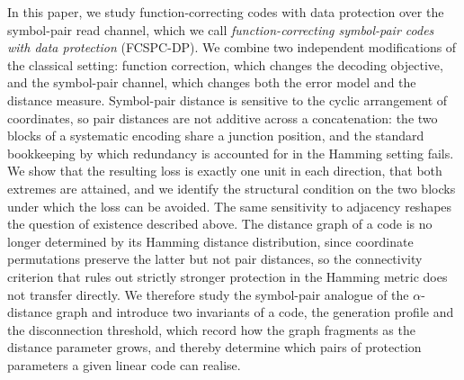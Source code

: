 \documentclass[11pt,draftclsnofoot,journal,onecolumn]{IEEEtran}
\begin{document}
        In this paper, we study function-correcting codes with data protection over the symbol-pair read channel, which we call \emph{function-correcting symbol-pair codes with data protection} (FCSPC-DP). We combine two independent modifications of the classical setting: function correction, which changes the decoding objective, and the symbol-pair channel, which changes both the error model and the distance measure. Symbol-pair distance is sensitive to the cyclic arrangement of coordinates, so pair distances are not additive across a concatenation: the two blocks of a systematic encoding share a junction position, and the standard bookkeeping by which redundancy is accounted for in the Hamming setting fails. We show that the resulting loss is exactly one unit in each direction, that both extremes are attained, and we identify the structural condition on the two blocks under which the loss can be avoided. The same sensitivity to adjacency reshapes the question of existence described above. The distance graph of a code is no longer determined by its Hamming distance distribution, since coordinate permutations preserve the latter but not pair distances, so the connectivity criterion that rules out strictly stronger protection in the Hamming metric does not transfer directly. We therefore study the symbol-pair analogue of the $\alpha$-distance graph and introduce two invariants of a code, the generation profile and the disconnection threshold, which record how the graph fragments as the distance parameter grows, and thereby determine which pairs of protection parameters a given linear code can realise.

\end{document}
